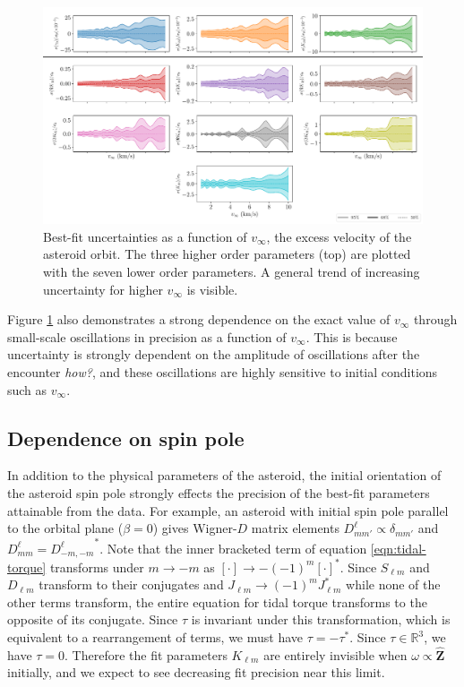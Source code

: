 \documentclass{aastex631}
\newcommand{\unit}[1]{\hat{\bm{#1}}}
\newcommand{\jtd}[1]{{\color{red}\textit{#1}}}
\begin{document}
\begin{figure}
  \centering
  \includegraphics[width=\textwidth]{scan-vex.pdf}
  \caption{Best-fit uncertainties as a function of $v_\infty$, the excess velocity of the asteroid orbit. The three higher order parameters (top) are plotted with the seven lower order parameters. A general trend of increasing uncertainty for higher $v_\infty$ is visible.}
  \label{fig:scan-vex}
\end{figure}

Figure \ref{fig:scan-vex} also demonstrates a strong dependence on the exact value of $v_\infty$ through small-scale oscillations in precision as a function of $v_\infty$. This is because uncertainty is strongly dependent on the amplitude of oscillations after the encounter \jtd{how?}, and these oscillations are highly sensitive to initial conditions such as $v_\infty$.


\subsection{Dependence on spin pole}
In addition to the physical parameters of the asteroid, the initial orientation of the asteroid spin pole strongly effects the precision of the best-fit parameters attainable from the data. For example, an asteroid with initial spin pole parallel to the orbital plane ($\beta=0$) gives Wigner-$D$ matrix elements $D^\ell_{m m'} \propto \delta_{m m'}$ and $D^\ell_{mm}={D^\ell_{-m,-m}}^*$. Note that the inner bracketed term of equation \ref{eqn:tidal-torque} transforms under $m \rightarrow -m$ as $[\cdot ] \rightarrow -(-1)^m[\cdot]^*$. Since $S_{\ell m}$ and $D_{\ell m}$ transform to their conjugates and $J_{\ell m} \rightarrow (-1)^m J_{\ell m}^*$ while none of the other terms transform, the entire equation for tidal torque transforms to the opposite of its conjugate. Since $\tau$ is invariant under this transformation, which is equivalent to a rearrangement of terms, we must have $\tau = -\tau^*$. Since $\tau \in \mathds{R}^3$, we have $\tau = 0$. Therefore the fit parameters $K_{\ell m}$ are entirely invisible when $\omega \propto \unit Z$ initially, and we expect to see decreasing fit precision near this limit.
\end{document}
